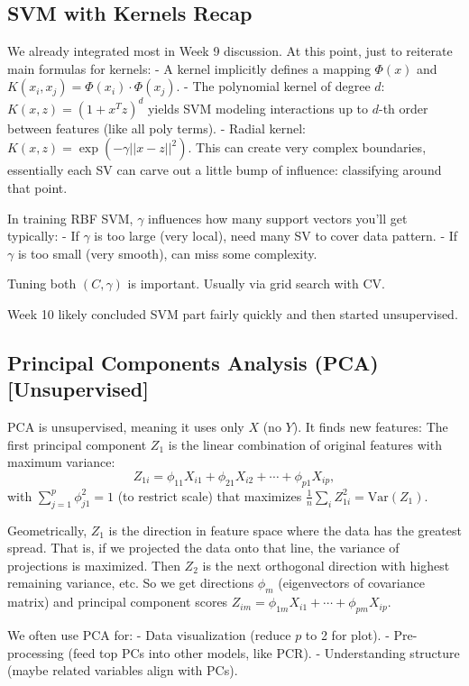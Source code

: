 \documentclass[11pt]{article}
\begin{document}
\subsection{SVM with Kernels Recap}
We already integrated most in Week 9 discussion. At this point, just to reiterate main formulas for kernels:
- A kernel implicitly defines a mapping $\Phi(x)$ and $K(x_i, x_j) = \Phi(x_i)\cdot \Phi(x_j)$.
- The polynomial kernel of degree $d$: $K(x,z)=(1+x^T z)^d$ yields SVM modeling interactions up to $d$-th order between features (like all poly terms).
- Radial kernel: $K(x,z)=\exp(-\gamma ||x-z||^2)$. This can create very complex boundaries, essentially each SV can carve out a little bump of influence: classifying around that point.

In training RBF SVM, $\gamma$ influences how many support vectors you'll get typically:
- If $\gamma$ is too large (very local), need many SV to cover data pattern.
- If $\gamma$ is too small (very smooth), can miss some complexity.

Tuning both $(C, \gamma)$ is important. Usually via grid search with CV.

Week 10 likely concluded SVM part fairly quickly and then started unsupervised.

\subsection{Principal Components Analysis (PCA) [Unsupervised]}
PCA is unsupervised, meaning it uses only $X$ (no $Y$). It finds new features:
The first principal component $Z_1$ is the linear combination of original features with maximum variance:
\[ Z_{1i} = \phi_{11} X_{i1} + \phi_{21}X_{i2} + \cdots + \phi_{p1}X_{ip}, \]
with $\sum_{j=1}^p \phi_{j1}^2 = 1$ (to restrict scale) that maximizes $\frac{1}{n}\sum_{i} Z_{1i}^2 = \text{Var}(Z_1)$.

Geometrically, $Z_1$ is the direction in feature space where the data has the greatest spread. That is, if we projected the data onto that line, the variance of projections is maximized. Then $Z_2$ is the next orthogonal direction with highest remaining variance, etc. So we get directions $\phi_m$ (eigenvectors of covariance matrix) and principal component scores $Z_{im} = \phi_{1m}X_{i1}+\cdots+\phi_{pm}X_{ip}$.

We often use PCA for:
- Data visualization (reduce $p$ to 2 for plot).
- Pre-processing (feed top PCs into other models, like PCR).
- Understanding structure (maybe related variables align with PCs).
\end{document}
